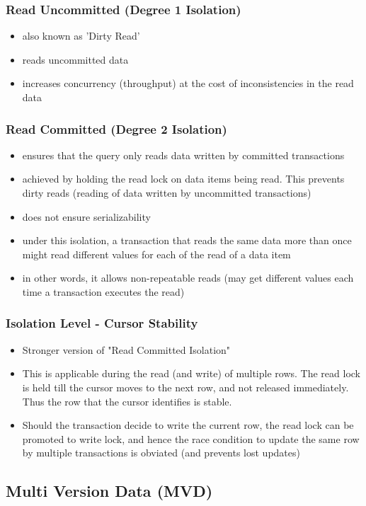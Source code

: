 \documentclass[12]{beamer}
\begin{document}
\begin{frame}
\frametitle{Read Uncommitted (Degree 1 Isolation)}
\begin{itemize}
\item also known as 'Dirty Read'
\item reads uncommitted data
\item increases concurrency (throughput) at the cost of inconsistencies in the read data
\end{itemize}
\end{frame}

\begin{frame}
\frametitle{Read Committed (Degree 2 Isolation)}
\begin{itemize}
\item ensures that the query only reads data written by committed transactions
\item achieved by holding the read lock on data items being read. This prevents dirty reads (reading of data written by uncommitted transactions)
\item does not ensure serializability
\item under this isolation, a transaction that reads the same data more than once might read different values for each of the read of a data item
\item in other words, it allows non-repeatable reads (may get different values each time a transaction executes the read)
\end{itemize}
\end{frame}

\begin{frame}
\frametitle{Isolation Level - Cursor Stability}
\begin{itemize}
\item Stronger version of "Read Committed Isolation"
\item This is applicable during the read (and write) of multiple rows. The read lock is held till the cursor moves to the next row, and not released immediately. Thus the row that the cursor identifies is stable.
\item Should the transaction decide to write the current row, the read lock can be promoted to write lock, and hence the race condition to update the same row by multiple transactions is obviated (and prevents lost updates)
\end{itemize}
\end{frame}

\subsection{Multi Version Data (MVD)}
\end{document}
